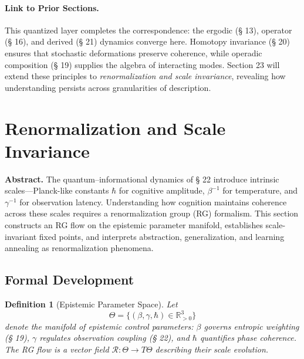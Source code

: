 \documentclass[12pt,a4paper,twoside,openright]{book}
\newtheorem{definition}[theorem]{Definition}
\begin{document}
\paragraph{Link to Prior Sections.}
This quantized layer completes the correspondence:  
the ergodic (§ 13), operator (§ 16), and derived (§ 21) dynamics converge here.  
Homotopy invariance (§ 20) ensures that stochastic deformations preserve coherence, while operadic composition (§ 19) supplies the algebra of interacting modes.  
Section 23 will extend these principles to \emph{renormalization and scale invariance}, revealing how understanding persists across granularities of description.



\section{Renormalization and Scale Invariance}
\label{sec:renormalization}

\textbf{Abstract.}
The quantum–informational dynamics of § 22 introduce intrinsic scales—Planck-like constants \(\hbar\) for cognitive amplitude, \(\beta^{-1}\) for temperature, and \(\gamma^{-1}\) for observation latency.  
Understanding how cognition maintains coherence across these scales requires a renormalization group (RG) formalism.  
This section constructs an RG flow on the epistemic parameter manifold, establishes scale-invariant fixed points, and interprets abstraction, generalization, and learning annealing as renormalization phenomena.

\subsection*{Formal Development}

\begin{definition}[Epistemic Parameter Space]
Let
\[
\Theta = \{(\beta,\gamma,\hbar)\in\mathbb{R}_{>0}^3\}
\]
denote the manifold of epistemic control parameters:  
\(\beta\) governs entropic weighting (§ 19),  
\(\gamma\) regulates observation coupling (§ 22),  
and \(\hbar\) quantifies phase coherence.  
The RG flow is a vector field \(\mathcal{R}:\Theta\to T\Theta\) describing their scale evolution.
\end{definition}
\end{document}
